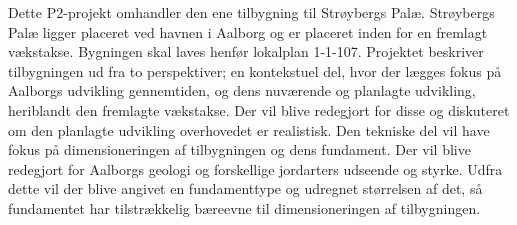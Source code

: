 Dette P2-projekt omhandler den ene tilbygning til Strøybergs Palæ.
\newline
\newline
Strøybergs Palæ ligger placeret ved havnen i Aalborg og er placeret inden for en fremlagt vækstakse. Bygningen skal laves henfør lokalplan 1-1-107. Projektet beskriver tilbygningen ud fra to perspektiver; en kontekstuel del, hvor der lægges fokus på Aalborgs udvikling gennemtiden, og dens nuværende og planlagte udvikling, heriblandt den fremlagte vækstakse. Der vil blive redegjort for disse og diskuteret om den planlagte udvikling overhovedet er realistisk. Den tekniske del vil have fokus på dimensioneringen af tilbygningen og dens fundament. Der vil blive redegjort for Aalborgs geologi og forskellige jordarters udseende og styrke. Udfra dette vil der blive angivet en fundamenttype og udregnet størrelsen af det, så fundamentet har tilstrækkelig bæreevne til dimensioneringen af tilbygningen.

